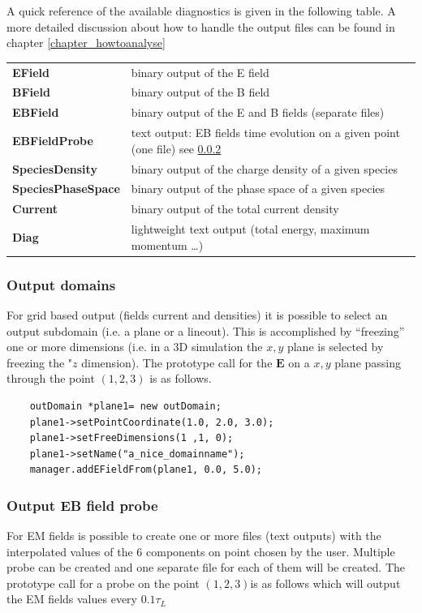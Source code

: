\documentclass[11pt,a4paper]{report}
\begin{document}
A quick reference of the available diagnostics is given in the following table.
A more detailed discussion about how to handle the output files can be found in chapter \ref{chapter_howtoanalyse}
\begin{center}
    \begin{tabular}{ l | l }
    	\textbf{EField} & binary output of the E field\\
    	\textbf{BField} & binary output of the B field\\
    	\textbf{EBField} & binary output of the E and B fields (separate files)\\
    	\textbf{EBFieldProbe} & text output: EB fields time evolution on a given point (one file) see \ref{em_probe}\\
    	\textbf{SpeciesDensity} & binary output of the charge density of a given species \\
    	\textbf{SpeciesPhaseSpace} & binary output of the phase space of a given species\\
    	\textbf{Current} & binary output of the total current density\\
    	\textbf{Diag} & lightweight text output (total energy, maximum momentum \ldots)
    \end{tabular}
\end{center}

\subsubsection{Output domains}
For grid based output (fields current and densities) it is possible to select an output subdomain (i.e. a plane or a lineout). This is accomplished by ``freezing'' one or more dimensions (i.e. in a 3D simulation the $x,y$ plane is selected by freezing the "$z$ dimension).
The prototype call for the $\mathbf{E}$ on a  $x,y$ plane passing through the point $(1,2,3)$ is as follows.

\begin{lstlisting}
	outDomain *plane1= new outDomain;
	plane1->setPointCoordinate(1.0, 2.0, 3.0);
	plane1->setFreeDimensions(1 ,1, 0);
	plane1->setName("a_nice_domainname");
	manager.addEFieldFrom(plane1, 0.0, 5.0);
\end{lstlisting}

\subsubsection{Output EB field probe}\label{em_probe}
For EM fields is possible to create one or more files (text outputs) with the interpolated values of the 6 components on point chosen by the user. Multiple probe can be created and one separate file for each of them will be created.
The prototype call for a probe on the point $(1,2,3)$is as follows which will output the EM fields values every $0.1\tau_L$
\end{document}
